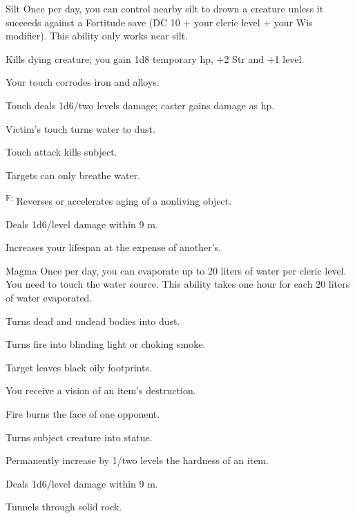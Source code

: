 {Silt}
{Once per day, you can control nearby silt to drown a creature unless it succeeds against a Fortitude save (DC 10 + \onehalf your cleric level + your Wis modifier). This ability only works near silt.}
{
	\item {} Kills dying creature; you gain 1d8 temporary hp, +2 Str and +1 level.
	\item {} Your touch corrodes iron and alloys.
	\item {} Touch deals 1d6/two levels damage; caster gains damage as hp.
	\item {} Victim's touch turns water to dust.
	\item {} Touch attack kills subject.
	\item {} Targets can only breathe water.
	\item {}\textsuperscript{F:} Reverses or accelerates aging of a nonliving object.
	\item {} Deals 1d6/level damage within 9 m.
	\item {} Increases your lifespan at the expense of another's.
}

{Magma}
{Once per day, you can evaporate up to 20 liters of water per cleric level. You need to touch the water source. This ability takes one hour for each 20 liters of water evaporated.}
{
	\item {} Turns dead and undead bodies into dust.
	\item {} Turns fire into blinding light or choking smoke.
	\item {} Target leaves black oily footprints.
	\item {} You receive a vision of an item's destruction.
	\item {} Fire burns the face of one opponent.
	\item {} Turns subject creature into statue.
	\item {} Permanently increase by 1/two levels the hardness of an item.
	\item {} Deals 1d6/level damage within 9 m.
	\item {} Tunnels through solid rock.
}

